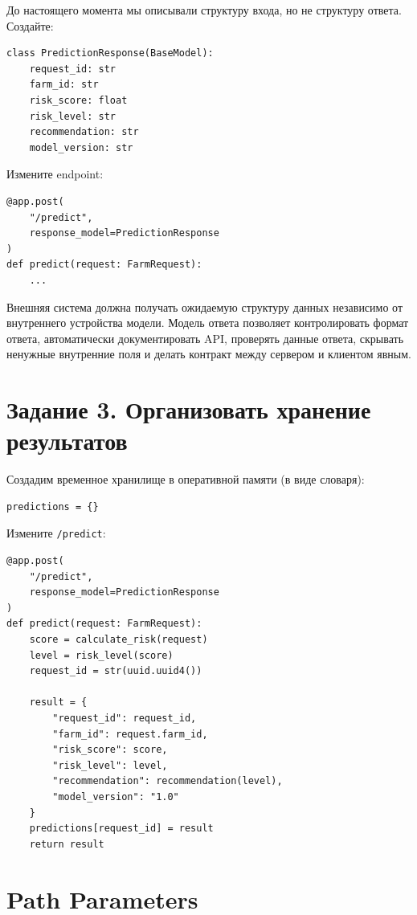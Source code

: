 \documentclass[12pt,a4paper]{article}
\begin{document}
До настоящего момента мы описывали структуру входа, но не структуру ответа. Создайте:

\begin{lstlisting}[caption={Модель PredictionResponse}]
class PredictionResponse(BaseModel):
    request_id: str
    farm_id: str
    risk_score: float
    risk_level: str
    recommendation: str
    model_version: str
\end{lstlisting}

Измените endpoint:

\begin{lstlisting}[caption={Endpoint /predict с response\_model}]
@app.post(
    "/predict",
    response_model=PredictionResponse
)
def predict(request: FarmRequest):
    ...
\end{lstlisting}

Внешняя система должна получать ожидаемую структуру данных независимо от внутреннего устройства модели. Модель ответа позволяет контролировать формат ответа, автоматически документировать API, проверять данные ответа, скрывать ненужные внутренние поля и делать контракт между сервером и клиентом явным.

\section{Задание 3. Организовать хранение результатов}

Создадим временное хранилище в оперативной памяти (в виде словаря):

\begin{lstlisting}[caption={Хранилище прогнозов}]
predictions = {}
\end{lstlisting}

Измените \texttt{/predict}:

\begin{lstlisting}[caption={/predict с сохранением результата}]
@app.post(
    "/predict",
    response_model=PredictionResponse
)
def predict(request: FarmRequest):
    score = calculate_risk(request)
    level = risk_level(score)
    request_id = str(uuid.uuid4())

    result = {
        "request_id": request_id,
        "farm_id": request.farm_id,
        "risk_score": score,
        "risk_level": level,
        "recommendation": recommendation(level),
        "model_version": "1.0"
    }
    predictions[request_id] = result
    return result
\end{lstlisting}

\section{Path Parameters}
\end{document}
